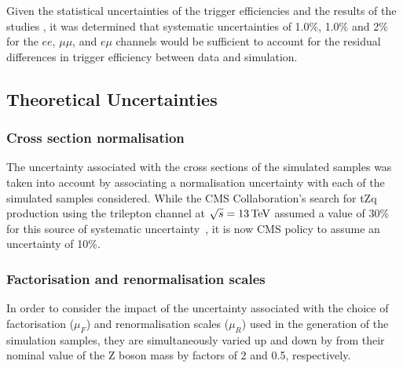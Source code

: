 %

Given the statistical uncertainties of the trigger efficiencies and the results of the studies , it was determined that systematic uncertainties of 1.0\%, 1.0\% and 2\% for the $ee$, $\mu\mu$, and $e \mu$ channels would be sufficient to account for the residual differences in trigger efficiency between data and simulation.

\subsection{Theoretical Uncertainties}\label{sec:theorySysts}
\subsubsection{Cross section normalisation}
The uncertainty associated with the cross sections of the simulated samples was taken into account by associating a normalisation uncertainty with each of the simulated samples considered.
While the CMS Collaboration's search for tZq production using the trilepton channel at $\sqrt{s} = 13\,\text{Te\hspace{-.08em}V}$ assumed a value of 30\% for this source of systematic uncertainty~\cite{Sirunyan:2017nbr}, it is now CMS policy to assume an uncertainty of 10\%.

\subsubsection{Factorisation and renormalisation scales}
In order to consider the impact of the uncertainty associated with the choice of factorisation ($\mu_{F}$) and renormalisation scales ($\mu_{R}$) used in the generation of the simulation samples, they are simultaneously varied up and down by from their nominal value of the Z boson mass by factors of 2 and 0.5, respectively.

